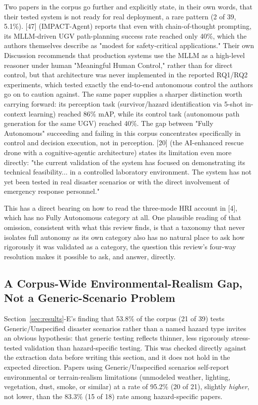 \documentclass[journal]{IEEEtran}
\begin{document}
Two papers in the corpus go further and explicitly state, in their own words, that their tested system is not ready for real deployment, a rare pattern (2 of 39, 5.1\%). [47] (IMPACT-Agent) reports that even with chain-of-thought prompting, its MLLM-driven UGV path-planning success rate reached only 40\%, which the authors themselves describe as "modest for safety-critical applications." Their own Discussion recommends that production systems use the MLLM as a high-level reasoner under human "Meaningful Human Control," rather than for direct control, but that architecture was never implemented in the reported RQ1/RQ2 experiments, which tested exactly the end-to-end autonomous control the authors go on to caution against. The same paper supplies a sharper distinction worth carrying forward: its perception task (survivor/hazard identification via 5-shot in-context learning) reached 86\% mAP, while its control task (autonomous path generation for the same UGV) reached 40\%. The gap between "Fully Autonomous" succeeding and failing in this corpus concentrates specifically in control and decision execution, not in perception. [20] (the AI-enhanced rescue drone with a cognitive-agentic architecture) states its limitation even more directly: "the current validation of the system has focused on demonstrating its technical feasibility... in a controlled laboratory environment. The system has not yet been tested in real disaster scenarios or with the direct involvement of emergency response personnel."

This has a direct bearing on how to read the three-mode HRI account in [4], which has no Fully Autonomous category at all. One plausible reading of that omission, consistent with what this review finds, is that a taxonomy that never isolates full autonomy as its own category also has no natural place to ask how rigorously it was validated as a category, the question this review's four-way resolution makes it possible to ask, and answer, directly.

\subsection{A Corpus-Wide Environmental-Realism Gap, Not a Generic-Scenario Problem}

Section~\ref{sec:results}-E's finding that 53.8\% of the corpus (21 of 39) tests Generic/Unspecified disaster scenarios rather than a named hazard type invites an obvious hypothesis: that generic testing reflects thinner, less rigorously stress-tested validation than hazard-specific testing. This was checked directly against the extraction data before writing this section, and it does not hold in the expected direction. Papers using Generic/Unspecified scenarios self-report environmental or terrain-realism limitations (unmodeled weather, lighting, vegetation, dust, smoke, or similar) at a rate of 95.2\% (20 of 21), slightly \emph{higher}, not lower, than the 83.3\% (15 of 18) rate among hazard-specific papers.
\end{document}
